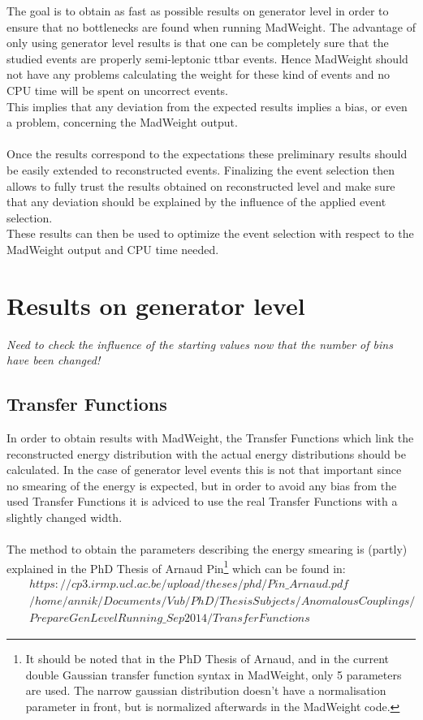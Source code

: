 
The goal is to obtain as fast as possible results on generator level in order to ensure that no bottlenecks are found when running MadWeight.
The advantage of only using generator level results is that one can be completely sure that the studied events are properly semi-leptonic ttbar events. Hence MadWeight should not have any problems calculating the weight for these kind of events and no CPU time will be spent on uncorrect events.\\
This implies that any deviation from the expected results implies a bias, or even a problem, concerning the MadWeight output.\\
\\
Once the results correspond to the expectations these preliminary results should be easily extended to reconstructed events. Finalizing the event selection then allows to fully trust the results obtained on reconstructed level and make sure that any deviation should be explained by the influence of the applied event selection.\\
These results can then be used to optimize the event selection with respect to the MadWeight output and CPU time needed.

\section{Results on generator level}
\textit{Need to check the influence of the starting values now that the number of bins have been changed!}

\subsection{Transfer Functions}
In order to obtain results with MadWeight, the Transfer Functions which link the reconstructed energy distribution with the actual energy distributions should be calculated. In the case of generator level events this is not that important since no smearing of the energy is expected, but in order to avoid any bias from the used Transfer Functions it is adviced to use the real Transfer Functions with a slightly changed width.\\
\\
The method to obtain the parameters describing the energy smearing is (partly) explained in the PhD Thesis of Arnaud Pin\footnote{It should be noted that in the PhD Thesis of Arnaud, and in the current double Gaussian transfer function syntax in MadWeight, only 5 parameters are used. The narrow gaussian distribution doesn't have a normalisation parameter in front, but is normalized afterwards in the MadWeight code.} which can be found in:
\begin{eqnarray*}
 & & https://cp3.irmp.ucl.ac.be/upload/theses/phd/Pin\_Arnaud.pdf \\
& & /home/annik/Documents/Vub/PhD/ThesisSubjects/AnomalousCouplings/\\ & & PrepareGenLevelRunning\_Sep2014/TransferFunctions
\end{eqnarray*}

